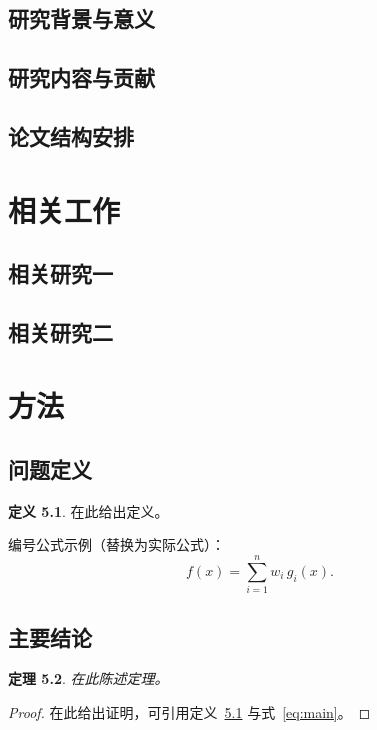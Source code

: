 \documentclass[UTF8,fontset=fandol,a4paper,zihao=-4,oneside,openany]{ctexbook}
\theoremstyle{plain}
\newtheorem{theorem}{定理}[chapter]
\theoremstyle{definition}
\newtheorem{definition}[theorem]{定义}
\begin{document}
\section{研究背景与意义}
\section{研究内容与贡献}
\section{论文结构安排}

\chapter{相关工作}
\section{相关研究一}
\section{相关研究二}

\chapter{方法}
\section{问题定义}
\begin{definition}\label{def:main}
在此给出定义。
\end{definition}

编号公式示例（替换为实际公式）：
\begin{equation}\label{eq:main}
  f(x) = \sum_{i=1}^{n} w_i\, g_i(x) .
\end{equation}

\section{主要结论}
\begin{theorem}\label{thm:main}
在此陈述定理。
\end{theorem}

\begin{proof}
在此给出证明，可引用定义~\ref{def:main} 与式~\eqref{eq:main}。
\end{proof}
\end{document}
